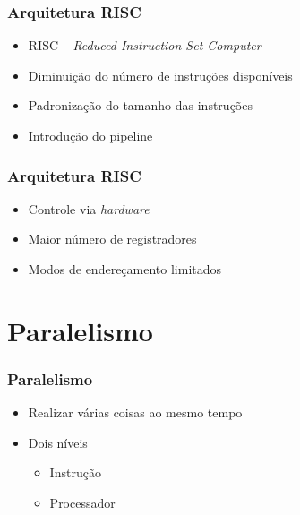 \documentclass[aspectratio=169,
				xcolor=table]{beamer}
\begin{document}
	\begin{frame}
		\frametitle{Arquitetura RISC}
		\begin{itemize}
			\item RISC – \textit{Reduced Instruction Set Computer}
			\vspace{1em}

			\item Diminuição do número de instruções disponíveis
			\vspace{1em}
			
			\item Padronização do tamanho das instruções
			\vspace{1em}

			\item Introdução do pipeline
		\end{itemize}
	\end{frame}
	
	\begin{frame}
		\frametitle{Arquitetura RISC}
		\begin{itemize}
			\item Controle via \textit{hardware}
			\vspace{1em}
			\item Maior número de registradores
			\vspace{1em}
			\item Modos de endereçamento limitados
		\end{itemize}
	\end{frame}
	
	\section{Paralelismo}	
	
	\begin{frame}
		\frametitle{Paralelismo}
		\begin{itemize}
			\item Realizar várias coisas ao mesmo tempo
			\vspace{1em}	
			\item Dois níveis
			\begin{itemize}
				\item Instrução
				\item Processador
			\end{itemize}

		\end{itemize}
	\end{frame}
	
\end{document}
